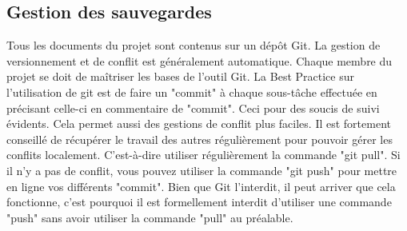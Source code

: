 \subsection{Gestion des sauvegardes}
Tous les documents du projet sont contenus sur un dépôt Git. 
La gestion de versionnement et de conflit est généralement automatique. 
Chaque membre du projet se doit de maîtriser les bases de l'outil Git.
La Best Practice sur l'utilisation de git est de faire un "commit" à chaque 
sous-tâche effectuée en précisant celle-ci en commentaire de "commit". Ceci 
pour des soucis de suivi évidents. Cela permet aussi des gestions de conflit
plus faciles.
Il est fortement conseillé de récupérer le travail des autres régulièrement
pour pouvoir gérer les conflits localement.
C'est-à-dire utiliser régulièrement la commande "git pull".
Si il n'y a pas de conflit, vous pouvez utiliser la commande "git push"
pour mettre en ligne vos différents "commit".
Bien que Git l'interdit, il peut arriver que cela fonctionne, c'est pourquoi
il est formellement interdit d'utiliser une commande "push" sans avoir utiliser
la commande "pull" au préalable.
